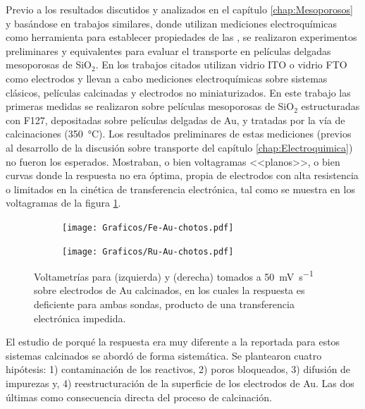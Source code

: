 {  			Previo a los resultados discutidos y analizados en el capítulo \ref{chap:Mesoporosos} y basándose en trabajos similares\cite{Otal2006,Calvo2009,Fattakhova-Rohlfing2007,Rohlfing2005}, donde utilizan mediciones electroquímicas como herramienta para establecer propiedades de las \pdm, se realizaron experimentos preliminares y equivalentes para evaluar el transporte en películas delgadas mesoporosas de SiO$_2$. En los trabajos citados utilizan vidrio ITO o vidrio FTO como electrodos y llevan a cabo mediciones electroquímicas sobre sistemas clásicos, películas calcinadas y electrodos no miniaturizados. En este trabajo las primeras medidas se realizaron sobre películas mesoporosas de SiO$_2$ estructuradas con F127, depositadas sobre películas delgadas de Au, y tratadas por la vía de calcinaciones (\SI{350}{\celsius}). Los resultados preliminares de estas mediciones (previos al desarrollo de la discusión sobre transporte del capítulo \ref{chap:Electroquimica}) no fueron los esperados. Mostraban, o bien voltagramas <<planos>>, o bien curvas donde la respuesta no era óptima, propia de electrodos con alta resistencia o limitados en la cinética de transferencia electrónica, tal como se muestra en los voltagramas de la figura \ref{fig:volta_chotos}.

  				\begin{figure}[ht]
		 	      \begin{subfigure}[t]{0.495\textwidth}
		          	\texttt{[image: Graficos/Fe-Au-chotos.pdf]}
		      		\end{subfigure}
		      	 \begin{subfigure}[t]{0.495\textwidth}
		          	\texttt{[image: Graficos/Ru-Au-chotos.pdf]}
		 			\end{subfigure}
		      	 \caption{Voltametrías para \ferroferri\space (izquierda) y \aminorutenio\space (derecha) tomados a \SI{50}{\milli\volt\per\second} sobre electrodos de Au calcinados, en los cuales la respuesta es deficiente para ambas sondas, producto de una transferencia electrónica impedida.}
		      	 \label{fig:volta_chotos}
	      		 \end{figure}	

  			 \vspace*{2mm}El estudio de porqué la respuesta era muy diferente a la reportada para estos sistemas calcinados se abordó de forma sistemática. Se plantearon cuatro hipótesis: 1) contaminación de los reactivos, 2) poros bloqueados, 3) difusión de impurezas y, 4) reestructuración de la superficie de los electrodos de Au. Las dos últimas como consecuencia directa del proceso de calcinación.

}
